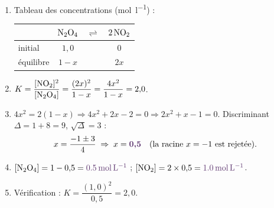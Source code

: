 \documentclass[11pt,a4paper]{article}
\newcommand{\rep}[1]{\textcolor{primarydark}{\textbf{#1}}}
\begin{document}
\begin{center}
\end{center}

\begin{correction}
\begin{enumerate}[label=\alph*),leftmargin=2em,topsep=2pt,itemsep=2pt]
  \item Tableau des concentrations (\si{\mol\per\litre}) :
  \begin{center}\small
  \begin{tabular}{@{}lccc@{}}
  \toprule
   & $\ce{N2O4}$ & $\rightleftharpoons$ & $2\,\ce{NO2}$ \\
  \midrule
  initial   & $1{,}0$ & & $0$ \\
  équilibre & $1-x$   & & $2x$ \\
  \bottomrule
  \end{tabular}
  \end{center}
  \item $K = \dfrac{[\ce{NO2}]^2}{[\ce{N2O4}]} = \dfrac{(2x)^2}{1-x} = \dfrac{4x^2}{1-x} = 2{,}0$.
  \item $4x^2 = 2(1-x) \Rightarrow 4x^2 + 2x - 2 = 0 \Rightarrow 2x^2 + x - 1 = 0$. Discriminant
        $\Delta = 1 + 8 = 9$, $\sqrt{\Delta}=3$ :
        \[ x = \frac{-1 \pm 3}{4} \;\Rightarrow\; x = \rep{0{,}5} \quad(\text{la racine } x=-1 \text{ est rejetée}). \]
  \item $[\ce{N2O4}] = 1-0{,}5 = \rep{\SI{0.5}{\mol\per\litre}}$ ;\;
        $[\ce{NO2}] = 2\times0{,}5 = \rep{\SI{1.0}{\mol\per\litre}}$.
  \item Vérification : $K = \dfrac{(1{,}0)^2}{0{,}5} = 2{,}0$. \checkmark
\end{enumerate}
\end{correction}
\end{document}
